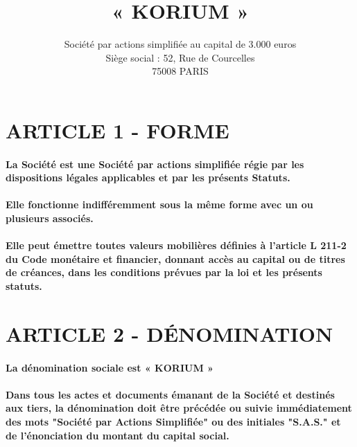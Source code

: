 \documentclass[a4paper, 11pt]{article}
\begin{document}
\title{« KORIUM »}
\author{
  Société par actions simplifiée au capital de 3.000 euros\\
  Siège social : 52, Rue de Courcelles\\
  75008 PARIS\\
}

\maketitle

\section*{ARTICLE 1 - FORME}

\paragraph{
  La Société est une Société par actions simplifiée régie par les dispositions  légales applicables et par les présents Statuts.
}

\paragraph{
  Elle fonctionne indifféremment sous la même forme avec un ou plusieurs associés.
}

\paragraph{
  Elle peut émettre toutes valeurs mobilières définies à l'article L 211-2 du Code monétaire et financier, donnant accès au capital ou de titres de créances, dans les conditions prévues par la loi et les présents statuts.
}

\section*{ARTICLE 2 - DÉNOMINATION}

\paragraph{
  La dénomination sociale est « KORIUM »
}

\paragraph{
  Dans tous les actes et documents émanant de la Société et destinés aux tiers, la dénomination doit être précédée ou suivie immédiatement des mots "Société par Actions Simplifiée" ou des initiales "S.A.S." et de l'énonciation du montant du capital social.
}
\end{document}
